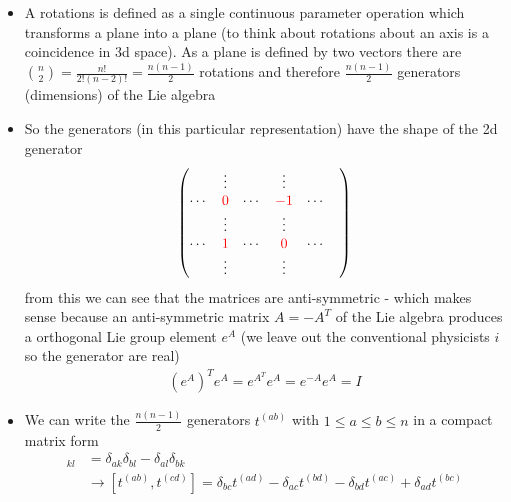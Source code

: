\documentclass[10pt,a4paper]{article}
\theoremstyle{definition}
\begin{document}
\begin{enumerate}
\begin{itemize}
\item A rotations is defined as a single continuous parameter operation which transforms a plane into a plane (to think about rotations about an axis is a coincidence in 3d space). As a plane is defined by two vectors there are $\binom{n}{2}=\frac{n!}{2!(n-2)!}=\frac{n(n-1)}{2}$ rotations and therefore $\frac{n(n-1)}{2}$ generators (dimensions) of the Lie algebra

\item So the generators (in this particular representation) have the shape of the 2d generator
\begin{align}
\left(\begin{matrix}
&\vdots&&\vdots\\
\cdots&\textcolor{red}{0} & \cdots& \textcolor{red}{-1} &\cdots&\\
&\vdots&&\vdots\\
\cdots&\textcolor{red}{1} & \cdots& \textcolor{red}{0} &\cdots&\\
&\vdots&&\vdots
\end{matrix}\right)
\end{align} 
from this we can see that the matrices are anti-symmetric - which makes sense because an anti-symmetric matrix $A=-A^T$ of the Lie algebra produces a orthogonal Lie group element $e^{A}$ (we leave out the conventional physicists $i$ so the generator are real)
\begin{align}
(e^A)^Te^A=e^{A^T}e^A=e^{-A}e^A=I
\end{align}
\item We can write the $\frac{n(n-1)}{2}$ generators $t^{(ab)}$ with $1\le a\le b\le n$ in a compact matrix form
\begin{align}
[t^{(ab)}]_{kl} &= \delta_{ak}\delta_{bl}-\delta_{al}\delta_{bk}\\
&\rightarrow [t^{(ab)},t^{(cd)}]
=\delta_{bc}t^{(ad)}
-\delta_{ac}t^{(bd)}
-\delta_{bd}t^{(ac)}
+\delta_{ad}t^{(bc)}
\end{align}
\end{itemize}



\end{enumerate}
\end{document}
